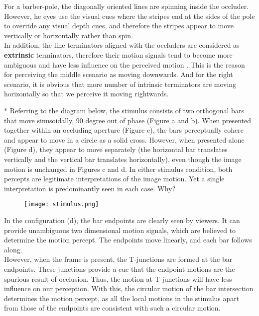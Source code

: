 \begin{questions}
\begin{solution}
    For a barber-pole, the diagonally oriented lines are spinning inside the occluder. However, he eyes use the visual cues where the stripes end at the sides of the pole to override any visual depth cues, and therefore the stripes appear to move vertically or horizontally rather than spin. \\
    In addition, the line terminators aligned with the occluders are considered as \textbf{extrinsic} terminators, therefore their motion signals tend to
    become more ambiguous and have less influence on the perceived motion \cite{vis04}. This is the reason for perceiving the middle scenario as moving downwards. And for the right scenario, it is obvious that more number of intrinsic terminators are moving horizontally so that we perceive it moving rightwards. 
\end{solution}

\question
* Referring to the diagram below, the stimulus consists of two orthogonal bars that move sinusoidally, 90 degree out of phase (Figure a and b). When presented together within an occluding aperture (Figure c), the bars perceptually cohere and appear to move in a circle as a solid cross. However, when presented alone (Figure d), they appear to move separately (the horizontal bar translates vertically and the vertical bar translates horizontally), even though the image motion is unchanged in Figures c and d. In either stimulus condition, both percepts are legitimate interpretations of the image motion. Yet a single interpretation is predominantly seen in each case. Why?

\begin{figure}[H]
    \centering
    \texttt{[image: stimulus.png]}
\end{figure}

\begin{solution}
    In the configuration (d), the bar endpoints are clearly seen by viewers. It can provide unambiguous two dimensional motion signals, which are believed to determine the motion percept. The endpoints move linearly, and each bar follows along.\\
    However, when the frame is present, the T-junctions are formed at the bar endpoints. These junctions provide a cue that the endpoint motions are the spurious result of occlusion. Thus, the motion at T-junctions will have less influence on our perception. With this, the circular motion of the bar intersection determines the motion percept, as all the local motions in the stimulus apart from those of the endpoints are consistent with such a circular motion.
\end{solution}


\end{questions}
